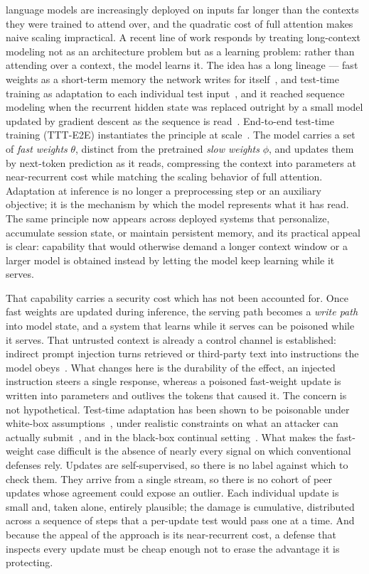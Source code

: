 \documentclass[journal]{IEEEtran}
\newcommand{\slow}{\phi}
\newcommand{\fast}{\theta}
\begin{document}
 language models are increasingly deployed on inputs far
longer than the contexts they were trained to attend over, and the quadratic cost
of full attention makes naive scaling impractical. A recent line of work responds
by treating long-context modeling not as an architecture problem but as a learning
problem: rather than attending over a context, the model learns it. The idea has a
long lineage --- fast weights as a short-term memory the network writes for
itself~\cite{ba2016fastweights}, and test-time training as adaptation to each
individual test input~\cite{sun2020ttt}, and it reached sequence modeling when
the recurrent hidden state was replaced outright by a small model updated by
gradient descent as the sequence is read~\cite{sun2024tttlayers}. End-to-end
test-time training (TTT-E2E) instantiates the principle at
scale~\cite{tandon2025tttE2E}. The model carries a set of \emph{fast weights}
$\fast$, distinct from the pretrained \emph{slow weights} $\slow$, and updates them
by next-token prediction as it reads, compressing the context into parameters at
near-recurrent cost while matching the scaling behavior of full attention.
Adaptation at inference is no longer a preprocessing step or an auxiliary
objective; it is the mechanism by which the model represents what it has read. The
same principle now appears across deployed systems that personalize, accumulate
session state, or maintain persistent memory, and its practical appeal is clear:
capability that would otherwise demand a longer context window or a larger model is
obtained instead by letting the model keep learning while it serves.

That capability carries a security cost which has not been accounted for. Once fast
weights are updated during inference, the serving path becomes a \emph{write path}
into model state, and a system that learns while it serves can be poisoned while it
serves. That untrusted context is already a control channel is established: indirect
prompt injection turns retrieved or third-party text into instructions the model
obeys~\cite{greshake2023injection}. What changes here is the durability of the
effect, an injected instruction steers a single response, whereas a poisoned
fast-weight update is written into parameters and outlives the tokens that caused
it. The concern is not hypothetical. Test-time adaptation has been shown to be
poisonable under white-box assumptions~\cite{cong2024ttp}, under realistic
constraints on what an attacker can actually submit~\cite{su2025realistic}, and in
the black-box continual setting~\cite{hoang2024rip}. What makes the fast-weight case
difficult is the absence of nearly every signal on which conventional defenses rely.
Updates are self-supervised, so there is no label against which to check them. They
arrive from a single stream, so there is no cohort of peer updates whose agreement
could expose an outlier. Each individual update is small and, taken alone, entirely
plausible; the damage is cumulative, distributed across a sequence of steps that a
per-update test would pass one at a time. And because the appeal of the approach is
its near-recurrent cost, a defense that inspects every update must be cheap enough
not to erase the advantage it is protecting.
\end{document}
